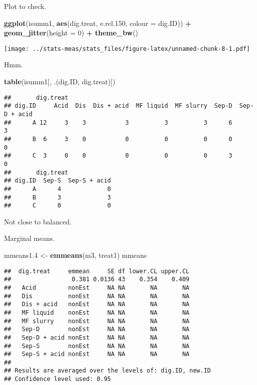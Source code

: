\documentclass[
]{article}
\newenvironment{Shaded}{\begin{snugshade}}{\end{snugshade}}
\newcommand{\AttributeTok}[1]{\textcolor[rgb]{0.13,0.29,0.53}{#1}}
\newcommand{\DecValTok}[1]{\textcolor[rgb]{0.00,0.00,0.81}{#1}}
\newcommand{\FloatTok}[1]{\textcolor[rgb]{0.00,0.00,0.81}{#1}}
\newcommand{\FunctionTok}[1]{\textcolor[rgb]{0.13,0.29,0.53}{\textbf{#1}}}
\newcommand{\NormalTok}[1]{#1}
\newcommand{\OtherTok}[1]{\textcolor[rgb]{0.56,0.35,0.01}{#1}}
\newcommand{\SpecialCharTok}[1]{\textcolor[rgb]{0.81,0.36,0.00}{\textbf{#1}}}
\newcommand{\StringTok}[1]{\textcolor[rgb]{0.31,0.60,0.02}{#1}}
\begin{document}
Plot to check.

\begin{Shaded}
\begin{Highlighting}[]
\FunctionTok{ggplot}\NormalTok{(isumm1, }\FunctionTok{aes}\NormalTok{(dig.treat, e.rel}\FloatTok{.150}\NormalTok{, }\AttributeTok{colour =}\NormalTok{ dig.ID)) }\SpecialCharTok{+}
  \FunctionTok{geom\_jitter}\NormalTok{(}\AttributeTok{height =} \DecValTok{0}\NormalTok{) }\SpecialCharTok{+}
  \FunctionTok{theme\_bw}\NormalTok{()}
\end{Highlighting}
\end{Shaded}

\texttt{[image: ../stats-meas/stats\_files/figure-latex/unnamed-chunk-8-1.pdf]}

Hmm.

\begin{Shaded}
\begin{Highlighting}[]
\FunctionTok{table}\NormalTok{(isumm1[, .(dig.ID, dig.treat)])}
\end{Highlighting}
\end{Shaded}

\begin{verbatim}
##       dig.treat
## dig.ID     Acid  Dis  Dis + acid  MF liquid  MF slurry  Sep-D  Sep-D + acid
##      A 12     3    3           3          3          3      6             3
##      B  6     3    0           0          0          0      0             0
##      C  3     0    0           0          0          0      3             0
##       dig.treat
## dig.ID  Sep-S  Sep-S + acid
##      A      4             0
##      B      3             3
##      C      0             0
\end{verbatim}

Not close to balanced.

Marginal means.

\begin{Shaded}
\begin{Highlighting}[]
\NormalTok{mmeans1}\FloatTok{.4} \OtherTok{\textless{}{-}} \FunctionTok{emmeans}\NormalTok{(m3, }\StringTok{\textquotesingle{}treat1\textquotesingle{}}\NormalTok{)}
\NormalTok{mmeans}
\end{Highlighting}
\end{Shaded}

\begin{verbatim}
##  dig.treat     emmean     SE df lower.CL upper.CL
##                 0.381 0.0136 43    0.354    0.409
##   Acid         nonEst     NA NA       NA       NA
##   Dis          nonEst     NA NA       NA       NA
##   Dis + acid   nonEst     NA NA       NA       NA
##   MF liquid    nonEst     NA NA       NA       NA
##   MF slurry    nonEst     NA NA       NA       NA
##   Sep-D        nonEst     NA NA       NA       NA
##   Sep-D + acid nonEst     NA NA       NA       NA
##   Sep-S        nonEst     NA NA       NA       NA
##   Sep-S + acid nonEst     NA NA       NA       NA
## 
## Results are averaged over the levels of: dig.ID, new.ID 
## Confidence level used: 0.95
\end{verbatim}
\end{document}
